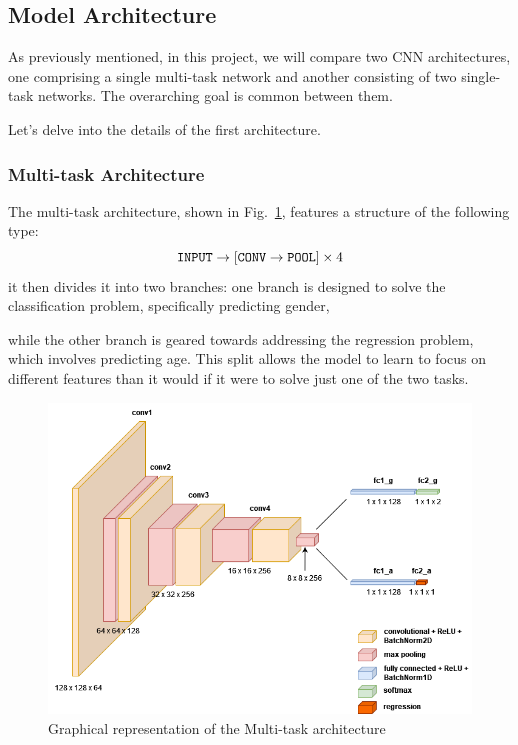 \subsection{Model Architecture} \label{sec:model}

As previously mentioned, in this project, we will compare two
CNN architectures, one comprising a single multi-task
network and another consisting of two single-task networks.
The overarching goal is common between them.

Let's delve into the details of the first architecture.

\subsubsection{Multi-task Architecture} \label{sec:multi}

The multi-task architecture, shown in Fig.~\ref{cnn1},
features a structure of the following type:
$$ \text{\texttt{INPUT}} \rightarrow [\text{\texttt{CONV}} \rightarrow \text{\texttt{POOL}}] \times 4$$
it then divides it into two branches:
one branch is designed to solve the classification problem,
specifically predicting gender,

while the other branch is geared towards addressing
the regression problem, which involves predicting age.
This split allows the model to learn to focus on
different features than it would if it were to solve
just one of the two tasks.


\begin{figure}[htbp]
    \centerline{\includegraphics[width=.5\textwidth]{images/shared_cnn.png}}
    \caption{Graphical representation of the Multi-task architecture}
    \label{cnn1}
\end{figure}